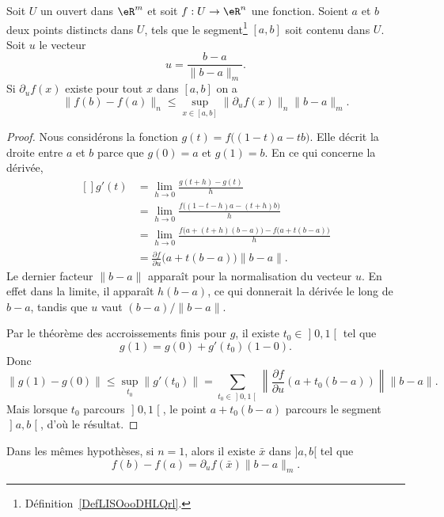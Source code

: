 \begin{theorem}\label{val_medio_1}		
    Soit $U$ un ouvert dans $\eR^m$ et soit $f:U\to\eR^n$ une fonction. Soient $a$ et $b$ deux points distincts dans $U$, tels que le segment\footnote{Définition~\ref{DefLISOooDHLQrl}.} $[a,b]$ soit contenu dans $U$. Soit $u$ le vecteur
	\[
		u=\frac{b-a}{\|b-a\|_m}.
	\]
	Si $\partial_u f(x)$ existe pour tout $x$ dans $[a,b]$ on a
	\[
		\|f(b)-f(a)\|_n\leq \sup_{x\in[a,b]}\|\partial_uf(x)\|_n\|b-a\|_m.
	\]
\end{theorem}

\begin{proof}
	Nous considérons la fonction $g(t)=f\big( (1-t)a-tb \big)$. Elle décrit la droite entre $a$ et $b$ parce que $g(0)=a$ et $g(1)=b$. En ce qui concerne la dérivée,
	\begin{equation}
		\begin{aligned}[]
			g'(t)&=\lim_{h\to 0} \frac{ g(t+h)-g(t) }{ h }\\
			&=\lim_{h\to 0} \frac{ f\big( (1-t-h)a-(t+h)b \big) }{ h }\\
			&=\lim_{h\to 0} \frac{ f\big( a+(t+h)(b-a) \big)-f\big( a+t(b-a) \big) }{ h }\\
			&=\frac{ \partial f }{ \partial u }\big( a+t(b-a) \big)\| b-a \|.
		\end{aligned}
	\end{equation}
	Le dernier facteur $\| b-a \|$ apparaît pour la normalisation du vecteur $u$. En effet dans la limite, il apparaît $h(b-a)$, ce qui donnerait la dérivée le long de $b-a$, tandis que $u$ vaut $(b-a)/\| b-a \|$.

	Par le théorème des accroissements finis pour $g$, il existe $t_0\in\mathopen] 0 , 1 \mathclose[$ tel que
	\begin{equation}
		g(1)=g(0)+g'(t_0)(1-0).
	\end{equation}
	Donc
	\begin{equation}
		\| g(1)-g(0) \|\leq\sup_{t_0}\| g'(t_0) \|=\sum_{t_0\in\mathopen] 0 , 1 \mathclose[}\left\| \frac{ \partial f }{ \partial u }(a+t_0(b-a)) \right\|\| b-a \|.
	\end{equation}
	Mais lorsque $t_0$ parcours $\mathopen] 0 , 1 \mathclose[$, le point $a+t_0(b-a)$ parcours le segment $\mathopen] a , b \mathclose[$, d'où le résultat.
\end{proof}

\begin{corollary}
	Dans les mêmes hypothèses, si $n=1$, alors il existe $\bar x $ dans $]a,b[$ tel que
	\[
		f(b)-f(a)=\partial_uf(\bar x)\|b-a\|_m.
	\]
\end{corollary}

